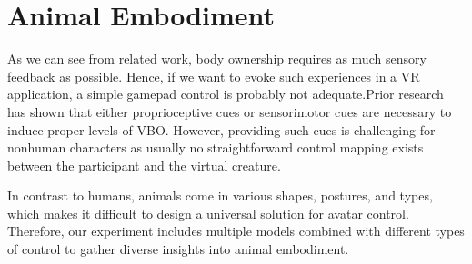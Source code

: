 \documentclass[conference]{IEEEtran}
\begin{document}
%






\section{Animal Embodiment}


As we can see from related work, body ownership requires as much sensory feedback as possible. Hence, if we want to evoke such experiences in a VR application, a simple gamepad control is probably not adequate.Prior research has shown that either proprioceptive cues or sensorimotor cues are necessary to induce proper levels of VBO. However, providing such cues is challenging for nonhuman characters as usually no straightforward control mapping exists between the participant and the virtual creature. 

In contrast to humans, animals come in various shapes, postures, and types, which makes it difficult to design a universal solution for avatar control. Therefore, our experiment includes multiple models combined with different types of control to gather diverse insights into animal embodiment.
\end{document}
